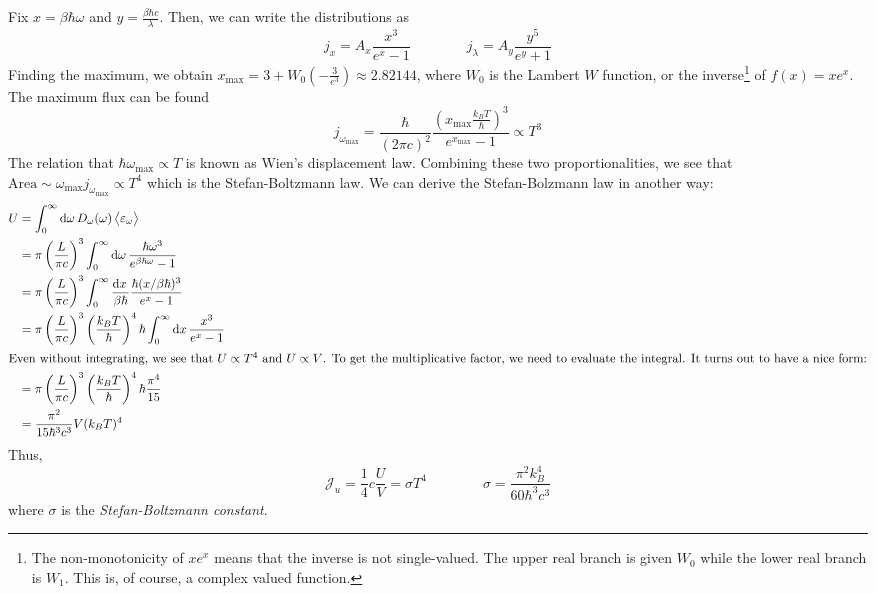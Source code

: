 Fix \(x=\beta\hbar\omega\) and \(y = \frac{\beta \hbar c}{\lambda}\). Then, we can write the distributions as
\[j_x = A_x \frac{x^3}{e^x-1}\qquad\qquad j_\lambda=A_y \frac{y^5}{e^y+1}\]
Finding the maximum, we obtain \(x_{\max}=3+W_0\left(-\frac{3}{e^3}\right)\approx 2.82144\), where \(W_0\) is the Lambert \(W\) function, or the inverse\footnote{The non-monotonicity of \(xe^x\) means that the inverse is not single-valued. The upper real branch is given \(W_0\) while the lower real branch is \(W_1\). This is, of course, a complex valued function.} of \(f(x) = xe^x\). The maximum flux can be found 
\[j_{\omega_{\max}}=\frac{\hbar}{(2\pi c)^2}\frac{\left(x_{\max} \frac{k_BT}{\hbar}\right)^3}{e^{x_{\max}}-1}\propto T^3\]
The relation that \(\hbar\omega_{\max}\propto T\) is known as Wien's displacement law. Combining these two proportionalities, we see that \(\text{Area}\sim\omega_{\max}j_{\omega_{\max}}\propto T^4\) which is the Stefan-Boltzmann law. We can derive the Stefan-Bolzmann law in another way:
\begin{align*}
	U &=\int_0^\infty\d{\omega}D_\omega(\omega)\vect{\varepsilon_\omega}\\
	  &=\pi\left(\frac{L}{\pi c}\right)^3\int_0^\infty\d{\omega}\frac{\hbar\omega^3}{e^{\beta\hbar\omega}-1}\\
	  &=\pi\left(\frac{L}{\pi c}\right)^3\int_0^\infty \frac{\d{x}}{\beta\hbar}\frac{\hbar(x/\beta\hbar)^3}{e^x-1}\\
	  &=\pi\left(\frac{L}{\pi c}\right)^3\left(\frac{k_BT}{\hbar}\right)^4\hbar\int_0^\infty\d{x}\frac{x^3}{e^x-1}\\
	  \intertext{Even without integrating, we see that \(U\propto T^4\) and \(U\propto V\). To get the multiplicative factor, we need to evaluate the integral. It turns out to have a nice form:}
	  &=\pi\left(\frac{L}{\pi c}\right)^3\left(\frac{k_BT}{\hbar}\right)^4\hbar\frac{\pi^4}{15}\\
	  &=\frac{\pi^2}{15\hbar^3c^3}V(k_BT)^4
\end{align*}
Thus,
\begin{equation}
	\mathcal J_u = \frac{1}{4}c\frac{U}{V}=\sigma T^4\qquad\qquad \sigma = \frac{\pi^2k_B^4}{60\hbar^3c^3}\end{equation}
where \(\sigma\) is the \emph{Stefan-Boltzmann constant}.

